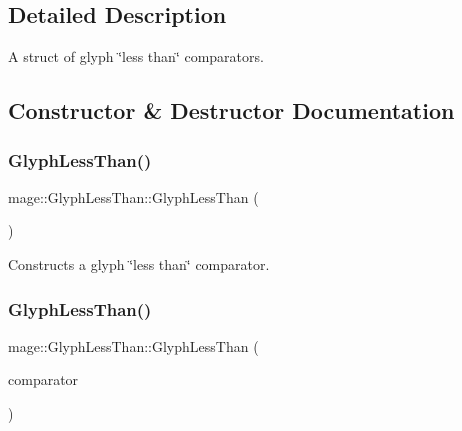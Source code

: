\subsection{Detailed Description}
A struct of glyph \char`\"{}less than\char`\"{} comparators. 

\subsection{Constructor \& Destructor Documentation}
\hypertarget{structmage_1_1_glyph_less_than_a2ad76294131749c19d83b6f92c74f1dc}{}\label{structmage_1_1_glyph_less_than_a2ad76294131749c19d83b6f92c74f1dc} 
\subsubsection{\texorpdfstring{Glyph\+Less\+Than()}{GlyphLessThan()}\hspace{0.1cm}{\footnotesize\ttfamily [1/3]}}
{\footnotesize\ttfamily mage\+::\+Glyph\+Less\+Than\+::\+Glyph\+Less\+Than (\begin{DoxyParamCaption}{ }\end{DoxyParamCaption})\hspace{0.3cm}{\ttfamily [default]}}

Constructs a glyph \char`\"{}less than\char`\"{} comparator. \hypertarget{structmage_1_1_glyph_less_than_a27fc34d9db41ebba7a7b40864837e7e7}{}\label{structmage_1_1_glyph_less_than_a27fc34d9db41ebba7a7b40864837e7e7} 
\subsubsection{\texorpdfstring{Glyph\+Less\+Than()}{GlyphLessThan()}\hspace{0.1cm}{\footnotesize\ttfamily [2/3]}}
{\footnotesize\ttfamily mage\+::\+Glyph\+Less\+Than\+::\+Glyph\+Less\+Than (\begin{DoxyParamCaption}\item[{const \hyperlink{structmage_1_1_glyph_less_than}{Glyph\+Less\+Than} \&}]{comparator }\end{DoxyParamCaption})\hspace{0.3cm}{\ttfamily [default]}}

